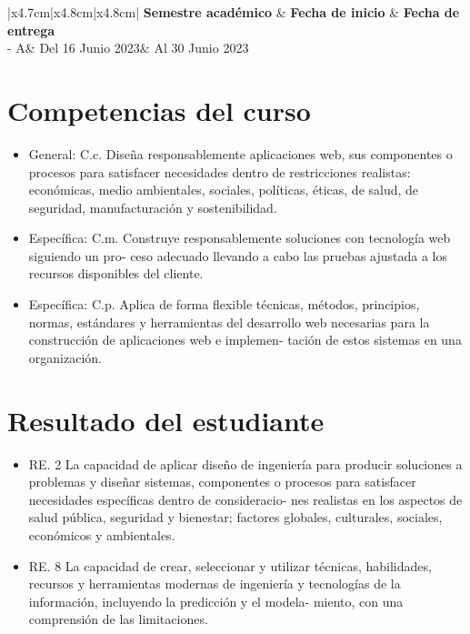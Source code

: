 \documentclass{article}
\newcommand{\itemAcademic}{2023 - A}
\newcommand{\itemInput}{Del 16 Junio 2023}
\newcommand{\itemOutput}{Al 30 Junio 2023}
\begin{document}
	\begin{table}[H]
		\begin{tabular}{|x{4.7cm}|x{4.8cm}|x{4.8cm}|}
			\hline 
			\color{white}\textbf{Semestre académico} & \color{white}\textbf{Fecha de inicio}  & \color{white}\textbf{Fecha de entrega}   \\
			\hline 
			\itemAcademic & \itemInput &  \itemOutput  \\
			\hline 
		\end{tabular}
	\end{table}
	
	\section{Competencias del curso}
	\begin{itemize}		
		\item General: C.c. Diseña responsablemente aplicaciones web, sus componentes o procesos para
            satisfacer necesidades dentro de restricciones realistas: económicas, medio ambientales, sociales,
            políticas, éticas, de salud, de seguridad, manufacturación y sostenibilidad.
		\item Específica: C.m. Construye responsablemente soluciones con tecnología web siguiendo un pro-
            ceso adecuado llevando a cabo las pruebas ajustada a los recursos disponibles del cliente.
		\item Específica: C.p. Aplica de forma flexible técnicas, métodos, principios, normas, estándares y
            herramientas del desarrollo web necesarias para la construcción de aplicaciones web e implemen-
            tación de estos sistemas en una organización.
	\end{itemize}
 
    \section{Resultado del estudiante}
    \begin{itemize}
        \item RE. 2 La capacidad de aplicar diseño de ingeniería para producir soluciones a problemas y diseñar
            sistemas, componentes o procesos para satisfacer necesidades específicas dentro de consideracio-
            nes realistas en los aspectos de salud pública, seguridad y bienestar; factores globales, culturales,
            sociales, económicos y ambientales.
        \item RE. 8 La capacidad de crear, seleccionar y utilizar técnicas, habilidades, recursos y herramientas
            modernas de ingeniería y tecnologías de la información, incluyendo la predicción y el modela-
            miento, con una comprensión de las limitaciones.
    \end{itemize}
		
\end{document}
